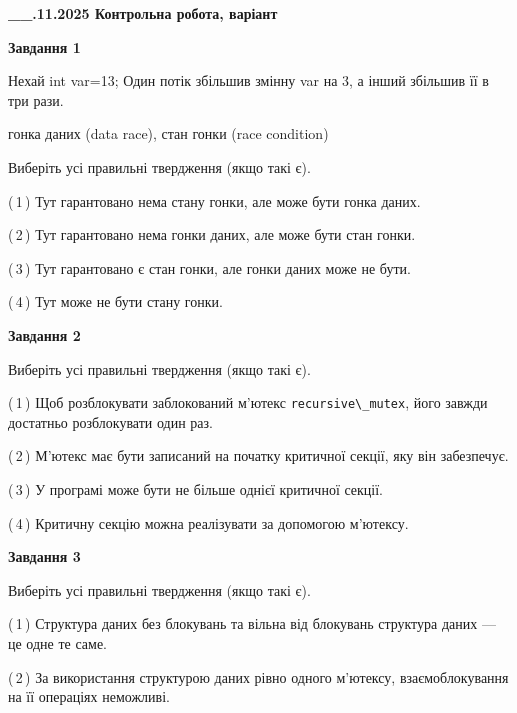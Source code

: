 \documentclass[12pt, ukrainian]{article}
\def\code#1{\Verb!#1!}
\begin{document}
\begin {large}

\textbf{\_\_.11.2025 Контрольна робота, варіант  }\par


{

\begin{center}
\textbf{Завдання 1}
\end{center}
Нехай int var=13; Один потік збільшив змінну var на 3, а інший збільшив її в три рази.

гонка даних (data race), стан гонки (race condition)

Виберіть усі правильні твердження (якщо такі є).\par
\vspace{2mm}
(\,1\,) Тут гарантовано нема стану гонки, але може бути гонка даних.%

(\,2\,) Тут гарантовано нема гонки даних, але може бути стан гонки.%

(\,3\,) Тут гарантовано є стан гонки, але гонки даних може не бути.%

(\,4\,) Тут може не бути стану гонки.%



\begin{center}
\textbf{Завдання 2}
\end{center}
Виберіть усі правильні твердження (якщо такі є).\par
\vspace{2mm}

(\,1\,) Щоб розблокувати заблокований м’ютекс \code{recursive\_mutex}, його завжди достатньо розблокувати один раз.%

(\,2\,) М’ютекс має бути записаний на початку критичної секції, яку він забезпечує.%

(\,3\,) У програмі може бути не більше однієї критичної секції.%

(\,4\,) Критичну секцію можна реалізувати за допомогою м’ютексу.%



\begin{center}
\textbf{Завдання 3}
\end{center}
Виберіть усі правильні твердження (якщо такі є).\par
\vspace{2mm}

(\,1\,) Структура даних без блокувань та вільна від блокувань структура даних --- це одне те саме.%

(\,2\,) За використання структурою даних рівно одного м’ютексу, взаємоблокування на її операціях неможливі.%

}
\end{large}
\end{document}
